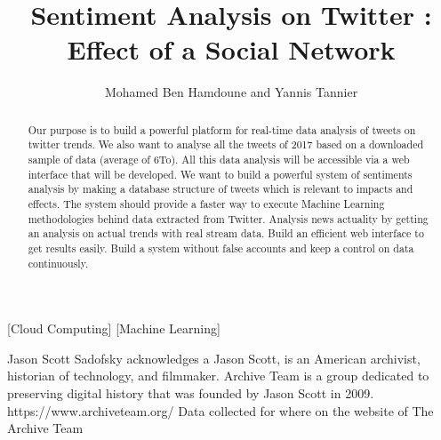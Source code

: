 \documentclass{acmtog} %
\begin{document}

\title{Sentiment Analysis on Twitter : Effect of a Social Network} %

\author{Mohamed Ben Hamdoune {\upshape and} Yannis Tannier
}

[Cloud Computing]
[Machine Learning]




\maketitle

\begin{bottomstuff}
Jason Scott Sadofsky acknowledges a  Jason Scott, is an American archivist, historian of technology, and filmmaker. Archive Team is a group dedicated to preserving digital history that was founded by Jason Scott in 2009.
https://www.archiveteam.org/
Data collected for where on the website of The Archive Team
\end{bottomstuff}


\begin{abstract}
Our purpose is to build a powerful platform \cite{Baltas17} for real-time data analysis of tweets on twitter trends. We also want to analyse all the tweets of 2017 based on a downloaded sample of data (average of 6To).
All this data analysis will be accessible via a web interface that will be developed.
We want to build a powerful system of sentiments analysis by making a database structure of tweets which is relevant to impacts and effects. The system should provide a faster way to execute Machine Learning methodologies behind data extracted from Twitter.
Analysis news actuality by getting an analysis on actual trends with real stream data.
Build an efficient web interface to get results easily.
Build a system without false accounts and keep a control on data continuously.
\end{abstract}
\end{document}
